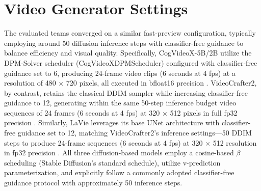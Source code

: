 \section{Video Generator Settings}
The evaluated teams converged on a similar fast-preview configuration, typically employing around 50 diffusion inference steps with classifier-free guidance to balance efficiency and visual quality. Specifically, CogVideoX-5B/2B utilize the DPM-Solver scheduler (CogVideoXDPMScheduler) configured with classifier-free guidance set to 6, producing 24-frame video clips (6 seconds at 4 fps) at a resolution of 480 × 720 pixels, all executed in bfloat16 precision \cite{yang2024cogvideox}.
VideoCrafter2, by contrast, retains the classical DDIM sampler while increasing classifier-free guidance to 12, generating within the same 50-step inference budget video sequences of 24 frames (6 seconds at 4 fps) at 320 × 512 pixels in full fp32 precision \cite{wang2023lavie}.
Similarly, LaVie leverages its base UNet architecture with classifier-free guidance set to 12, matching VideoCrafter2’s inference settings—50 DDIM steps to produce 24-frame sequences (6 seconds at 4 fps) at 320 × 512 resolution in fp32 precision \cite{chen2024videocrafter2}.
All three diffusion-based models employ a cosine-based $\beta$ scheduling (Stable Diffusion’s standard schedule), utilize v-prediction parameterization, and explicitly follow a commonly adopted classifier-free guidance protocol with approximately 50 inference steps.


